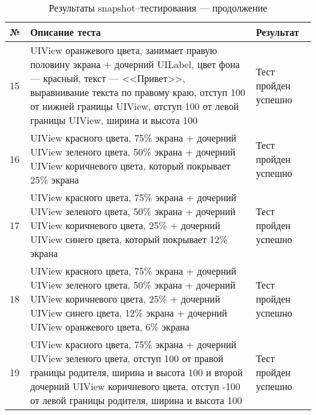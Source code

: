 \begin{table}[!htb]
 \label{table:tests3}
 \begin{center}
  \caption{Результаты snapshot--тестирования --- продолжение}
 \begin{tabular}{|p{0.6cm}|p{10cm}|p{5cm}|}
  \hline
   \bfseries № & \bfseries Описание теста & \bfseries Результат \\ \hline
   15 & UIView оранжевого цвета, занимает правую половину экрана + дочерний UILabel, цвет фона --- красный, текст --- <<Привет>>, выравнивание текста по правому краю, отступ 100 от нижней границы UIView, отступ 100 от левой границы UIView, ширина и высота 100 & Тест пройден успешно  \\ \hline
   16 & UIView красного цвета, 75\% экрана + дочерний UIView зеленого цвета, 50\% экрана + дочерний UIView коричневого цвета, который покрывает 25\% экрана  & Тест пройден успешно  \\ \hline   
   17 & UIView красного цвета, 75\% экрана + дочерний UIView зеленого цвета, 50\% экрана + дочерний UIView коричневого цвета, 25\% + дочерний UIView синего цвета, который покрывает 12\% экрана  & Тест пройден успешно  \\ \hline
   18 & UIView красного цвета, 75\% экрана + дочерний UIView зеленого цвета, 50\% экрана + дочерний UIView коричневого цвета, 25\% + дочерний UIView синего цвета, 12\% экрана + дочерний UIView оранжевого цвета, 6\% экрана  & Тест пройден успешно  \\ \hline
   19 & UIView красного цвета, 75\% экрана + дочерний UIView зеленого цвета, отступ 100 от правой границы родителя, ширина и высота 100 и второй дочерний UIView коричневого цвета, отступ -100 от левой границы родителя, ширина и высота 100 & Тест пройден успешно  \\ \hline
     \end{tabular}
 \end{center}
\end{table}

